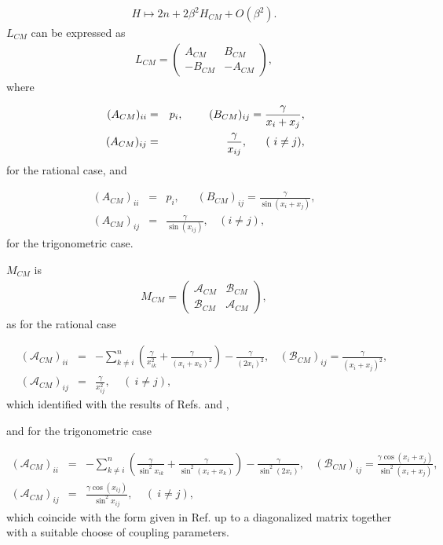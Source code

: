 \documentclass[a4paper,12pt]{article}
\begin{document}
\begin{eqnarray}
H\longmapsto 2n+2\beta ^{2}H_{CM}+O(\beta ^{2}).
\end{eqnarray}
$L_{CM}$ can be expressed as
\begin{eqnarray}
L_{CM}=\left(
\begin{array}{ll}
A_{CM} & B_{CM} \\
-B_{CM} & -A_{CM}
\end{array}
\right),
\end{eqnarray}
where

\begin{eqnarray}
\ (A_{CM})_{ii}&=&p_{i},\ \ \ \ \ \ \ (B_{CM})_{ij}=\frac{\gamma }{%
x_{i}+x_{j}},  \nonumber \\
(A_{CM})_{ij}&=&\frac{\gamma }{x_{ij}}, \ \ \ \ \ (\ i\neq j),
\end{eqnarray}
for the rational case, and

\begin{eqnarray}
(A_{CM})_{ii} &=&p_{i},\ \ \ \ \ \ \ (B_{CM})_{ij}=\frac{\gamma }{\sin
(x_{i}+x_{j})},	 \nonumber \\
(A_{CM})_{ij} &=&\frac{\gamma }{\sin (x_{ij})},\ \ \ \ (i\neq
j),
\end{eqnarray}
for the trigonometric case.

$M_{CM}$ is
\begin{eqnarray}
M_{CM}=\left(
\begin{array}{ll}
\mathcal{A}_{CM} & \mathcal{B}_{CM} \\
\mathcal{B}_{CM} & \mathcal{A}_{CM}
\end{array}
\right),
\end{eqnarray}
as for the rational case

\begin{eqnarray}
(\mathcal{A}_{CM})_{ii} &=&-\sum_{k\neq i}^{n}(\frac{\gamma }{x_{ik}^{2}}+%
\frac{\gamma }{(x_{i}+x_{k})^{2}})-\frac{\gamma }{(2x_{i})^{2}},\ \ \ \ (%
\mathcal{B}_{CM})_{ij}=\frac{\gamma }{(x_{i}+x_{j})^{2}},  \nonumber \\
(\mathcal{A}_{CM})_{ij} &=&\frac{\gamma }{x_{ij}^{2}},\ \ \ \ \ (\ i\neq j),
\end{eqnarray}
which identified with the results of Refs. \cite{op} and \cite{bcs},

\noindent and for the trigonometric case

\begin{eqnarray}
(\mathcal{A}_{CM})_{ii} &=&-\sum_{k\neq i}^{n}(\frac{\gamma }{\sin ^{2}x_{ik}%
}+\frac{\gamma }{\sin ^{2}(x_{i}+x_{k})})-\frac{\gamma }{\sin ^{2}(2x_{i})}%
,\ \ \ \ (\mathcal{B}_{CM})_{ij}=\frac{\gamma \cos (x_{i}+x_{j})}{\sin
^{2}(x_{i}+x_{j})},  \nonumber \\
(\mathcal{A}_{CM})_{ij} &=&\frac{\gamma \cos (x_{ij})}{\sin ^{2}x_{ij}},\ \
\ \ \ (\ i\neq j),
\end{eqnarray}
which coincide with the form given in Ref. \cite{op} up to a diagonalized matrix
together with a suitable choose of coupling parameters.
\end{document}

